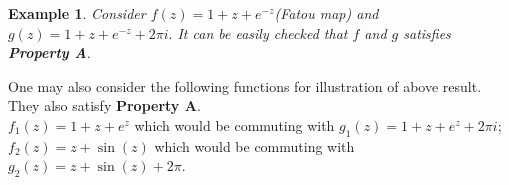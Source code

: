 \documentclass[a4paper,12pt]{amsart}
\numberwithin{equation}{section}
\newtheorem{theorem}{Theorem}[section]
\newtheorem{example}[theorem]{Example}
\begin{document}
\begin{example}
Consider $f(z)=1+z+e^{-z}$(Fatou map) and  $g(z)=1+z+e^{-z}+ 2\pi i.$ It can be easily checked that $f$ and $g$ satisfies \textbf{Property A}. 
\end{example}
\noindent One may also consider the following functions for illustration of above result. They also satisfy \textbf{Property A}.\\
 $f_1(z)=1+z+e^{z}$  which would be commuting with $g_1(z)=1+z+e^{z}+ 2\pi i$;  $f_2(z)=z+\sin(z)$ which would  be commuting with $g_2(z)=z+ \sin(z)+2\pi.$
\\
\end{document}
